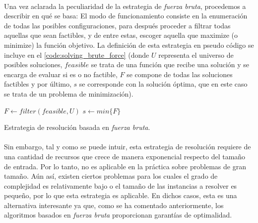 \documentclass{subfiles}
\begin{document}
        \paragraph{}
        Una vez aclarada la peculiaridad de la estrategia de \emph{fuerza bruta}, procedemos a describir en qué se basa: El modo de funcionamiento consiste en la enumeración de todas las posibles configuraciones, para después proceder a filtrar todas aquellas que sean factibles, y de entre estas, escoger aquella que maximize (o minimize) la función objetivo. La definición de esta estrategia en pseudo código se incluye en el \cref{code:solving_brute_force} (donde $U$ representa el universo de posibles soluciones, $feasible$ se trata de una función que recibe una solución y se encarga de evaluar si es o no factible, $F$ se compone de todas las soluciones factibles y por último, $s$ se corresponde con la solución óptima, que en este caso se trata de un problema de minimización).

        \begin{algorithm}[ht]
          \SetAlgoLined
          $F \gets filter(feasible, U)$\;
          $s \gets min\{F\}$\;
          \caption{Estrategia de resolución basada en \emph{fuerza bruta}.}
          \label{code:solving_brute_force}
        \end{algorithm}

        \paragraph{}
        Sin embargo, tal y como se puede intuir, esta estrategia de resolución requiere de una cantidad de recursos que crece de manera exponencial respecto del tamaño de entrada. Por lo tanto, no es aplicable en la práctica sobre problemas de gran tamaño. Aún así, existen ciertos problemas para los cuales el grado de complejidad es relativamente bajo o el tamaño de las instancias a resolver es pequeño, por lo que esta estrategia es aplicable. En dichos casos, esta es una alternativa interesante ya que, como se ha comentado anteriormente, los algoritmos basados en \emph{fuerza bruta} proporcionan garantías de optimalidad.
\end{document}
